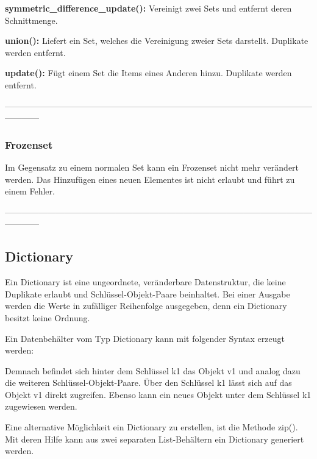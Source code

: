\textbf{symmetric_difference_update():}
Vereinigt zwei Sets und entfernt deren Schnittmenge.

    
\textbf{union():}
Liefert ein Set, welches die Vereinigung zweier Sets darstellt. Duplikate werden entfernt.

    
\textbf{update():}
Fügt einem Set die Items eines Anderen hinzu. Duplikate werden entfernt.

    
------------------------------------------------------------------------------------------------------------------------
\subsubsection{Frozenset}

Im Gegensatz zu einem \qlqq{}normalen\qrqq{} Set kann ein Frozenset nicht mehr verändert werden. Das Hinzufügen eines neuen Elementes ist nicht erlaubt und führt zu einem Fehler.


------------------------------------------------------------------------------------------------------------------------
\subsection{Dictionary}
Ein Dictionary ist eine ungeordnete, veränderbare Datenstruktur, die keine Duplikate erlaubt und Schlüssel-Objekt-Paare beinhaltet. Bei einer Ausgabe werden die Werte in zufälliger Reihenfolge ausgegeben, denn ein Dictionary besitzt keine Ordnung.

Ein Datenbehälter vom Typ Dictionary kann mit folgender Syntax erzeugt werden:


Demnach befindet sich hinter dem Schlüssel \glqq{}k1\grqq{} das Objekt \glqq{}v1\grqq{} und analog dazu die weiteren Schlüssel-Objekt-Paare. Über den Schlüssel  \glqq{}k1\grqq{} lässt sich auf das Objekt \glqq{}v1\grqq{} direkt zugreifen. Ebenso kann ein neues Objekt unter dem Schlüssel \glqq{}k1\grqq{} zugewiesen werden.


Eine alternative Möglichkeit ein Dictionary zu erstellen, ist die Methode zip(). Mit deren Hilfe kann aus zwei separaten List-Behältern ein Dictionary generiert werden.


